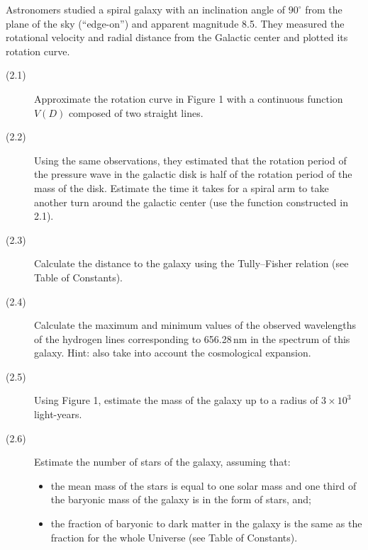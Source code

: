 Astronomers studied a spiral galaxy with an inclination angle of $90^\circ$
from the plane of the sky (``edge-on'') and apparent magnitude 8.5. They
measured the rotational velocity and radial distance from the Galactic center
and plotted its rotation curve.

\begin{description}
\item[(2.1)] Approximate the rotation curve in Figure 1 with a continuous
  function $V(D)$ composed of two straight lines.
\item[(2.2)] Using the same observations, they estimated that the rotation
  period of the pressure wave in the galactic disk is half of the rotation
  period of the mass of the disk. Estimate the time it takes for a spiral arm
  to take another turn around the galactic center (use the function
  constructed in 2.1).
\item[(2.3)] Calculate the distance to the galaxy using the Tully--Fisher
  relation (see Table of Constants).
\item[(2.4)] Calculate the maximum and minimum values of the observed
  wavelengths of the hydrogen lines corresponding to 656.28\,nm in the
  spectrum of this galaxy. Hint: also take into account the cosmological
  expansion.
\item[(2.5)] Using Figure 1, estimate the mass of the galaxy up to a radius of
  $3 \times 10^3$ light-years.
\item[(2.6)] Estimate the number of stars of the galaxy, assuming that:
  \begin{itemize}
  \item the mean mass of the stars is equal to one solar mass and one third of
    the baryonic mass of the galaxy is in the form of stars, and;
  \item the fraction of baryonic to dark matter in the galaxy is the same as
    the fraction for the whole Universe (see Table of Constants).
  \end{itemize}
\end{description}
